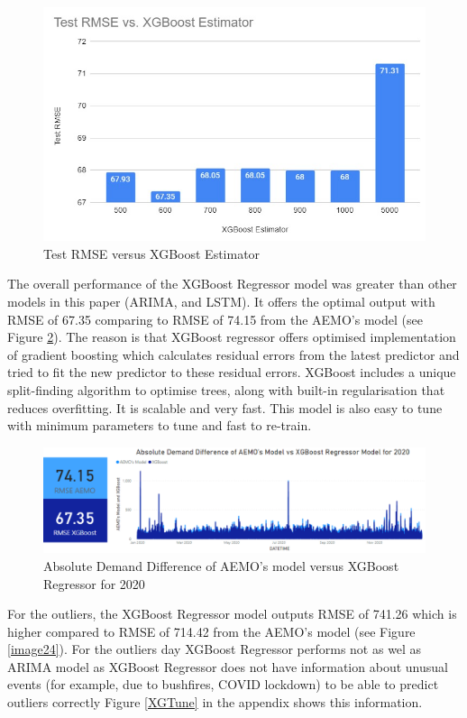 \documentclass[mstat,12pt]{unswthesis}
\begin{document}
\begin{figure}[H]
\includegraphics[width=140mm]{image1.jpg}
\caption{Test RMSE versus XGBoost Estimator}
\label{image1}
\end{figure}

The overall performance of the XGBoost Regressor model was greater than
other models in this paper (ARIMA, and LSTM). It offers the optimal
output with RMSE of 67.35 comparing to RMSE of 74.15 from the AEMO's
model (see Figure \ref{image2}). The reason is that XGBoost regressor
offers optimised implementation of gradient boosting which calculates
residual errors from the latest predictor and tried to fit the new
predictor to these residual errors. XGBoost includes a unique
split-finding algorithm to optimise trees, along with built-in
regularisation that reduces overfitting. It is scalable and very fast.
This model is also easy to tune with minimum parameters to tune and fast
to re-train.

\begin{figure}[H]
\includegraphics[width=140mm]{image2.png}
\caption{Absolute Demand Difference of AEMO's model versus XGBoost Regressor for 2020 }
\label{image2}
\end{figure}

For the outliers, the XGBoost Regressor model outputs RMSE of 741.26
which is higher compared to RMSE of 714.42 from the AEMO's model (see
Figure \ref{image24}). For the outliers day XGBoost Regressor performs
not as wel as ARIMA model as XGBoost Regressor does not have information
about unusual events (for example, due to bushfires, COVID lockdown) to
be able to predict outliers correctly Figure \ref{XGTune} in the
appendix shows this information.
\end{document}
